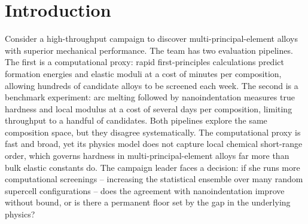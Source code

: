 \documentclass[twoside,twocolumn,9pt]{article}
\begin{document}
\renewcommand*\rmdefault{bch}\normalfont\upshape
\rmfamily
\section*{}
\vspace{-1cm}





\section{Introduction}

Consider a high-throughput campaign to discover multi-principal-element alloys with superior mechanical performance.\cite{George2019HEA,Cantor2004OriginalHEA,Miracle2017HEAreview} The team has two evaluation pipelines. The first is a computational proxy: rapid first-principles calculations predict formation energies and elastic moduli at a cost of minutes per composition, allowing hundreds of candidate alloys to be screened each week. The second is a benchmark experiment: arc melting followed by nanoindentation measures true hardness and local modulus at a cost of several days per composition, limiting throughput to a handful of candidates. Both pipelines explore the same composition space, but they disagree systematically. The computational proxy is fast and broad, yet its physics model does not capture local chemical short-range order, which governs hardness in multi-principal-element alloys far more than bulk elastic constants do.\cite{Lejaeghere2016Reproducibility,Broitman2017HardnessOverview} The campaign leader faces a decision: if she runs more computational screenings -- increasing the statistical ensemble over many random supercell configurations -- does the agreement with nanoindentation improve without bound, or is there a permanent floor set by the gap in the underlying physics?
\end{document}
